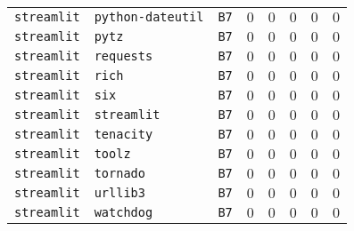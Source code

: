 \begin{table}
\begin{tabular}{llllllll}
\texttt{streamlit} & \texttt{python-dateutil} & \texttt{B7} & $0$ & $0$ & $0$ & $0$ & $0$ \\
\texttt{streamlit} & \texttt{pytz} & \texttt{B7} & $0$ & $0$ & $0$ & $0$ & $0$ \\
\texttt{streamlit} & \texttt{requests} & \texttt{B7} & $0$ & $0$ & $0$ & $0$ & $0$ \\
\texttt{streamlit} & \texttt{rich} & \texttt{B7} & $0$ & $0$ & $0$ & $0$ & $0$ \\
\texttt{streamlit} & \texttt{six} & \texttt{B7} & $0$ & $0$ & $0$ & $0$ & $0$ \\
\texttt{streamlit} & \texttt{streamlit} & \texttt{B7} & $0$ & $0$ & $0$ & $0$ & $0$ \\
\texttt{streamlit} & \texttt{tenacity} & \texttt{B7} & $0$ & $0$ & $0$ & $0$ & $0$ \\
\texttt{streamlit} & \texttt{toolz} & \texttt{B7} & $0$ & $0$ & $0$ & $0$ & $0$ \\
\texttt{streamlit} & \texttt{tornado} & \texttt{B7} & $0$ & $0$ & $0$ & $0$ & $0$ \\
\texttt{streamlit} & \texttt{urllib3} & \texttt{B7} & $0$ & $0$ & $0$ & $0$ & $0$ \\
\texttt{streamlit} & \texttt{watchdog} & \texttt{B7} & $0$ & $0$ & $0$ & $0$ & $0$ \\
\bottomrule
\end{tabular}
\end{table}
